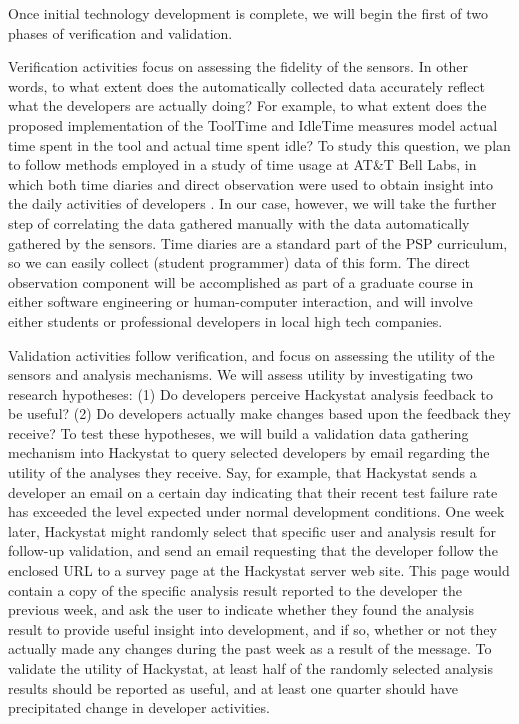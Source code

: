 Once initial technology development is complete, we will begin the first of 
two phases of verification and validation.

Verification activities focus on assessing the fidelity of the sensors. In
other words, to what extent does the automatically collected data
accurately reflect what the developers are actually doing?  For example, to
what extent does the proposed implementation of the ToolTime and IdleTime
measures model actual time spent in the tool and actual time spent idle?
To study this question, we plan to follow methods employed in a study
of time usage at AT\&T Bell Labs, in which both time diaries and direct
observation were used to obtain insight into the daily activities of
developers \cite{Perry95}.  In our case, however, we will take the further
step of correlating the data gathered manually with the data automatically
gathered by the sensors.  Time diaries are a standard part of the PSP
curriculum, so we can easily collect (student programmer) data of this
form. The direct observation component will be accomplished as part of a
graduate course in either software engineering or human-computer interaction,
and will involve either students or professional developers in local high
tech companies.

Validation activities follow verification, and focus on assessing the
utility of the sensors and analysis mechanisms. We will assess utility by
investigating two research hypotheses: (1) Do developers perceive Hackystat
analysis feedback to be useful? (2) Do developers actually make changes
based upon the feedback they receive?  To test these hypotheses, we will
build a validation data gathering mechanism into Hackystat to query
selected developers by email regarding the utility of the analyses they
receive.  Say, for example, that Hackystat sends a developer an email on a
certain day indicating that their recent test failure rate has exceeded the
level expected under normal development conditions.  One week later,
Hackystat might randomly select that specific user and analysis result for
follow-up validation, and send an email requesting that the developer
follow the enclosed URL to a survey page at the Hackystat server web site.
This page would contain a copy of the specific analysis result reported to
the developer the previous week, and ask the user to indicate whether they
found the analysis result to provide useful insight into development, and
if so, whether or not they actually made any changes during the past week
as a result of the message.  To validate the utility of Hackystat, at least
half of the randomly selected analysis results should be reported as
useful, and at least one quarter should have precipitated change in
developer activities.

